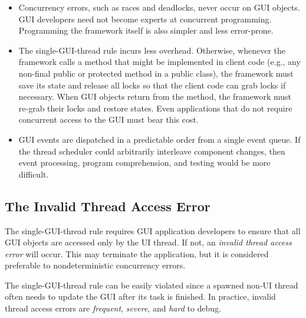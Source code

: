 \begin{itemize}

\item Concurrency errors, such as races and deadlocks, never occur on GUI objects. 
GUI developers need not become experts at concurrent programming. Programming the
framework itself is also simpler and less error-prone.

\tinystep

\item The single-GUI-thread rule incurs less overhead.
Otherwise, whenever the framework calls a method that might
be implemented in client code (e.g., any non-final public or protected method in a public class),
the framework must save its state and release all locks so that the client code can grab locks
if necessary. When GUI objects return from the method, the framework must re-grab their locks and
restore states.  Even applications that do not require concurrent access to the GUI
must bear this cost.

\tinystep

\item GUI events are dispatched in a predictable order from a single event queue.
If the thread scheduler could arbitrarily interleave component changes, then event processing,
program comprehension, and testing would be more difficult.
\end{itemize}


\subsection{The Invalid Thread Access Error}

The single-GUI-thread rule requires GUI application developers to
 ensure that all GUI objects are accessed only by the UI thread.
If not, an \textit{invalid thread access error} will occur. This may
terminate the application, but it is considered preferable
to nondeterministic concurrency errors.

The single-GUI-thread rule can be easily violated since a spawned non-UI thread often needs to update
the GUI  after its  task is finished.
In practice, invalid thread access errors are \textit{frequent}, \textit{severe}, and \textit{hard} to debug.

